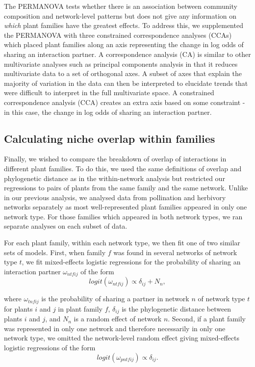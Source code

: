 \documentclass[12pt]{article}
\begin{document}
\begin{spacing}{1.5}
  The PERMANOVA tests whether there is an association between
  community composition and network-level patterns but does not
  give any information on \emph{which} plant families have the
  greatest effects. To address this, we supplemented the 
  PERMANOVA with three constrained correspondence analyses (CCAs)
  which placed plant families along an axis representing the
  change in log odds of sharing an interaction partner.
  A correspondence 
  analysis (CA) is similar to other multivariate
  analyses such as principal components analysis in that it
  reduces multivariate data to a set of orthogonal axes. A
  subset of axes that explain the majority of variation in 
  the data can then be interpreted to elucidate trends that
  were difficult to interpret in the full multivariate space.
  A constrained correspondence analysis (CCA) creates an extra
  axis based on some constraint - in this case, the change in
  log odds of sharing an interaction partner. 


\subsection*{Calculating niche overlap within families}

  Finally, we wished to compare the breakdown of overlap of interactions in
  different plant families. To do this, we used the same definitions of overlap
  and phylogenetic distance as in the within-network analysis but restricted
  our regressions to pairs of plants from the same family and the same network.
  Unlike in our previous analysis, we analysed data from pollination and
  herbivory networks separately as most well-represented plant families appeared
  in only one network type. For those families which appeared in both network types, 
  we ran separate analyses on each subset of data.


  For each plant family, within each network type, we then fit one of two similar 
  sets of models. First, when family $f$ was found in several networks of network
  type $t$, we fit mixed-effects logistic regressions for the probability of sharing an interaction partner $\omega_{ntfij}$ of the form
  \begin{equation}
    logit(\omega_{ntfij}) \propto \delta_{ij} + N_{n} ,
    \label{full}
  \end{equation}

  \noindent where $\omega_{tnfij}$ is the probability of sharing a partner 
  in network $n$ of network type $t$ for plants $i$ and $j$ in plant family $f$,
  $\delta_{ij}$ is the phylogenetic distance between plants $i$ and $j$, and
  $N_{n}$ is a random effect of network $n$.
  Second, if a plant family was represented in only one network 
  and therefore necessarily in only one network type, we omitted the 
  network-level random effect giving mixed-effects logistic regressions of the form
 \begin{equation}
    logit(\omega_{pntfij}) \propto \delta_{ij} .
    \label{minimal}
  \end{equation}


\end{spacing}
\end{document}
